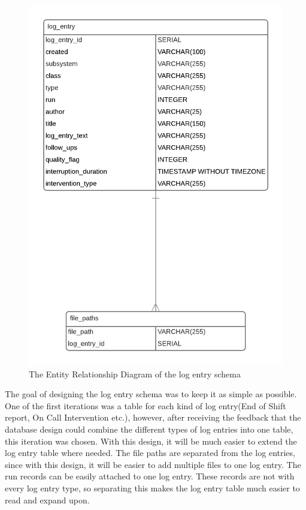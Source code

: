 \documentclass[paper=a4, fontsize=11pt,twoside]{scrartcl}	%
\begin{document}
\begin{figure}[H]
\centering
\includegraphics[scale=0.7]{erd_log_entry}
\caption{The Entity Relationship Diagram of the log entry schema}
\end{figure}
\noindent
The goal of designing the log entry schema was to keep it as simple as possible. One of the first iterations was a table for each kind of log entry(End of Shift report, On Call Intervention etc.), however, after receiving the feedback that the database design could combine the different types of log entries into one table, this iteration was chosen. With this design, it will be much easier to extend the log entry table where needed. The file paths are separated from the log entries, since with this design, it will be easier to add multiple files to one log entry. The run records can be easily attached to one log entry. These records are not with every log entry type, so separating this makes the log entry table much easier to read and expand upon. \\ \\
\end{document}
